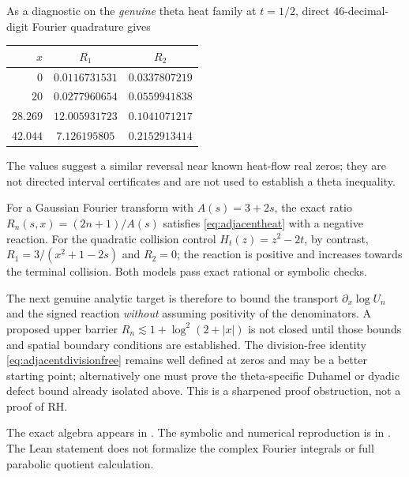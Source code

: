 As a diagnostic on the \emph{genuine} theta
heat family at $t=1/2$, direct
$46$-decimal-digit Fourier quadrature gives
\begin{center}
\begin{tabular}{rcc}
\hline
$x$ & $R_1$ & $R_2$\\
\hline
$0$ & $0.0116731531$ & $0.0337807219$\\
$20$ & $0.0277960654$ & $0.0559941838$\\
$28.269$ & $12.005931723$ & $0.1041071217$\\
$42.044$ & $7.126195805$ & $0.2152913414$\\
\hline
\end{tabular}
\end{center}
The values suggest a similar reversal near
known heat-flow real zeros; they are not
directed interval certificates and are
not used to establish a theta inequality.

For a Gaussian Fourier transform with
$A(s)=3+2s$, the exact ratio
$R_n(s,x)=(2n+1)/A(s)$ satisfies
\eqref{eq:adjacentheat} with a negative reaction.
For the quadratic collision control
$H_t(z)=z^2-2t$, by contrast,
$R_1=3/(x^2+1-2s)$ and $R_2=0$;
the reaction is positive and increases
towards the terminal collision.
Both models pass exact rational
or symbolic checks.

The next genuine analytic target is therefore
to bound the transport
$\partial_x\log U_n$ and the signed reaction
\emph{without} assuming positivity of
the denominators. A proposed upper barrier
$R_n\lesssim1+\log^2(2+|x|)$ is not closed
until those bounds and spatial boundary
conditions are established. The division-free
identity \eqref{eq:adjacentdivisionfree}
remains well defined at zeros and may be a
better starting point; alternatively one must
prove the theta-specific Duhamel or dyadic
defect bound already isolated above.
This is a sharpened proof obstruction,
not a proof of RH.

The exact algebra appears in
.
The symbolic and numerical reproduction
is in .
The Lean statement does not formalize the
complex Fourier integrals or full
parabolic quotient calculation.
